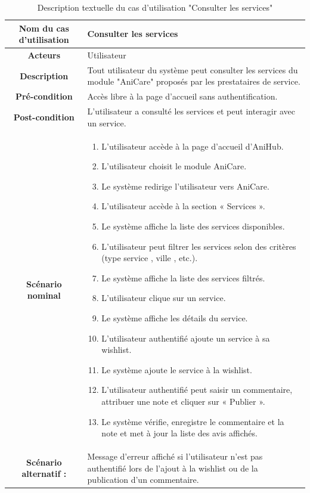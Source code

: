 \begin{longtable}{|c|p{11cm}|}
\caption{Description textuelle du cas d’utilisation "Consulter les services"}
\label{tab:consulter_services} \\
\hline
\cellcolor{coloranicare} \textbf{Nom du cas d'utilisation } & Consulter les services \\
\hline
\cellcolor{coloranicare} \textbf{Acteurs} & Utilisateur \\
\hline
\cellcolor{coloranicare} \textbf{Description } & Tout utilisateur du système peut consulter les services du module "AniCare" proposés par les prestataires de service. \\
\hline
\cellcolor{coloranicare} \textbf{Pré-condition } & Accès libre à la page d’accueil sans authentification. \\
\hline
\cellcolor{coloranicare} \textbf{Post-condition } & L’utilisateur a consulté les services et peut interagir avec un service. \\
\hline

\cellcolor{coloranicare} \textbf{Scénario nominal } & 
\begin{enumerate}
\item L’utilisateur accède à la page d’accueil d’AniHub.
\item L’utilisateur choisit le module AniCare.
\item Le système redirige l’utilisateur vers AniCare.
\item L’utilisateur accède à la section « Services ».
\item Le système affiche la liste des services disponibles.
\item L’utilisateur peut filtrer les services selon des critères (type service , ville , etc.).
\item Le système affiche la liste des services filtrés.
\item L’utilisateur clique sur un service.
\item Le système affiche les détails du service.
\item L’utilisateur authentifié ajoute un service à sa wishlist.
\item Le système ajoute le service à la wishlist.
\item L’utilisateur authentifié peut saisir un commentaire, attribuer une note et cliquer sur « Publier ».
\item Le système vérifie, enregistre le commentaire et la note et met à jour la liste des avis affichés.
\end{enumerate} \\

\hline
\cellcolor{coloranicare} \textbf{Scénario alternatif :} &
Message d’erreur affiché si l’utilisateur n’est pas authentifié lors de l’ajout à la wishlist ou de la publication d’un commentaire. \\
\hline

\end{longtable}
 \newpage 
